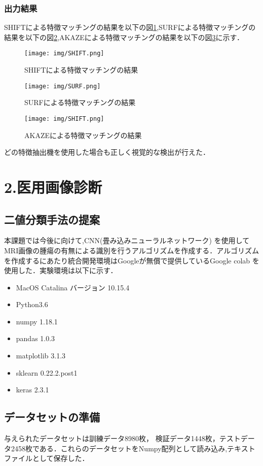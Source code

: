 \documentclass{article}
\begin{document}
\subsubsection{出力結果}

SHIFTによる特徴マッチングの結果を以下の図\ref{SHIFT},SURFによる特徴マッチングの結果を以下の図\ref{SURF},AKAZEによる特徴マッチングの結果を以下の図\ref{AKAZE}に示す．

\begin{figure}[H]
\centering
\texttt{[image: img/SHIFT.png]}
    \caption{SHIFTによる特徴マッチングの結果}
\label{SHIFT}
\end{figure}

\begin{figure}[H]
\centering
\texttt{[image: img/SURF.png]}
    \caption{SURFによる特徴マッチングの結果}
\label{SURF}
\end{figure}

\begin{figure}[H]
\centering
\texttt{[image: img/SHIFT.png]}
    \caption{AKAZEによる特徴マッチングの結果}
\label{AKAZE}
\end{figure}

どの特徴抽出機を使用した場合も正しく視覚的な検出が行えた．
\section{2.医用画像診断}
\subsection{二値分類手法の提案}
本課題では今後に向けて,CNN(畳み込みニューラルネットワーク)
を使用してMRI画像の腫瘍の有無による識別を行うアルゴリズムを作成する．アルゴリズムを作成するにあたり統合開発環境はGoogleが無償で提供しているGoogle colab
を使用した．実験環境は以下に示す．
\begin{itemize}
    \item MacOS Catalina バージョン 10.15.4
    \item Python3.6
    \item numpy 1.18.1
    \item pandas 1.0.3
    \item matplotlib 3.1.3
    \item sklearn 0.22.2.post1
    \item keras 2.3.1 
\end{itemize}
\subsection{データセットの準備}
与えられたデータセットは訓練データ8980枚，
検証データ1448枚，テストデータ2458枚である．これらのデータセットをNumpy配列として読み込み,テキストファイルとして保存した．
\end{document}
